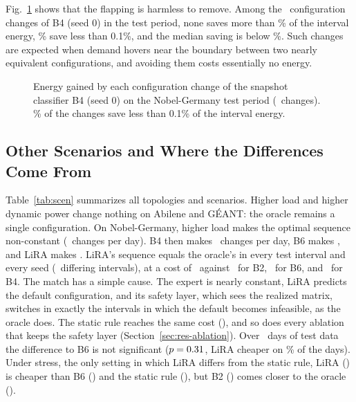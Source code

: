 \documentclass[journal]{IEEEtran}
\begin{document}
Fig.~\ref{fig:gain} shows that the flapping is harmless to remove. Among the \gainChanges\ configuration changes of B4 (seed 0) in the test period, none saves more than \gainMax\% of the interval energy, \gainTenthShare\% save less than 0.1\%, and the median saving is below \gainMedianBelow\%. Such changes are expected when demand hovers near the boundary between two nearly equivalent configurations, and avoiding them costs essentially no energy.

\begin{figure}[t]
\centering
{}
\caption{Energy gained by each configuration change of the snapshot classifier B4 (seed 0) on the Nobel-Germany test period (\gainChanges\ changes). \gainTenthShare\% of the changes save less than 0.1\% of the interval energy.}
\label{fig:gain}
\end{figure}

\subsection{Other Scenarios and Where the Differences Come From}

Table~\ref{tab:scen} summarizes all topologies and scenarios. Higher load and higher dynamic power change nothing on Abilene and G\'{E}ANT: the oracle remains a single configuration. On Nobel-Germany, higher load makes the optimal sequence non-constant (\nobhlOchg\ changes per day). B4 then makes \nobhlBFourchg\ changes per day, B6 makes \nobhlBsixChg, and LiRA makes \nobhlLiRAchg. LiRA's sequence equals the oracle's in every test interval and every seed (\hlLiraOracleDiff\ differing intervals), at a cost of \nobJLiRAhl\ against \nobJBtwohl\ for B2, \nobJBsixhl\ for B6, and \nobhlJBFour\ for B4. The match has a simple cause. The expert is nearly constant, LiRA predicts the default configuration, and its safety layer, which sees the realized matrix, switches in exactly the intervals in which the default becomes infeasible, as the oracle does. The static rule reaches the same cost (\staticJhl), and so does every ablation that keeps the safety layer (Section~\ref{sec:res-ablation}). Over \nobTestDays\ days of test data the difference to B6 is not significant ($p=0.31$, LiRA cheaper on \effBsixDayshl\% of the days). Under stress, the only setting in which LiRA differs from the static rule, LiRA (\nobJLiRAst) is cheaper than B6 (\nobJBsixst) and the static rule (\staticJst), but B2 (\nobJBtwost) comes closer to the oracle (\nobJOst).
\end{document}
